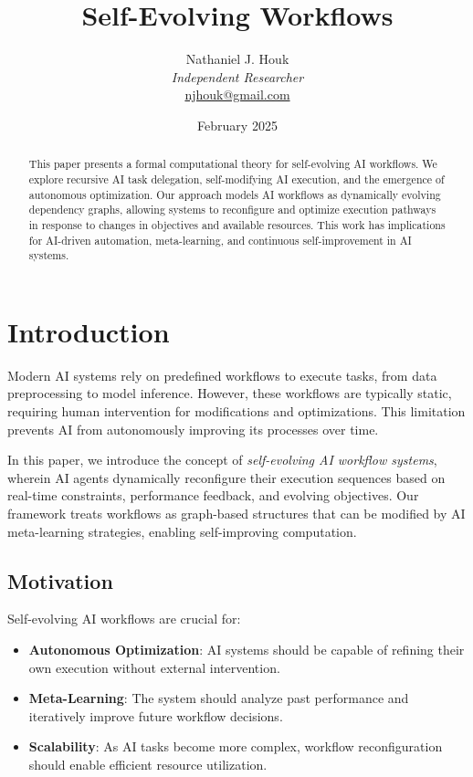 \documentclass{article}
\title{Self-Evolving Workflows}
\author{Nathaniel J. Houk\\
\textit{Independent Researcher}\\
\href{mailto:njhouk@gmail.com}{njhouk@gmail.com}}
\date{February 2025}
\begin{document}
\maketitle
\tableofcontents

\begin{abstract}
This paper presents a formal computational theory for self-evolving AI workflows. We explore recursive AI task delegation, self-modifying AI execution, and the emergence of autonomous optimization. Our approach models AI workflows as dynamically evolving dependency graphs, allowing systems to reconfigure and optimize execution pathways in response to changes in objectives and available resources. This work has implications for AI-driven automation, meta-learning, and continuous self-improvement in AI systems.
\end{abstract}

\section{Introduction}

Modern AI systems rely on predefined workflows to execute tasks, from data preprocessing to model inference. However, these workflows are typically static, requiring human intervention for modifications and optimizations. This limitation prevents AI from autonomously improving its processes over time.

In this paper, we introduce the concept of \emph{self-evolving AI workflow systems}, wherein AI agents dynamically reconfigure their execution sequences based on real-time constraints, performance feedback, and evolving objectives. Our framework treats workflows as graph-based structures that can be modified by AI meta-learning strategies, enabling self-improving computation.

\subsection{Motivation}

Self-evolving AI workflows are crucial for:
\begin{itemize}
    \item \textbf{Autonomous Optimization}: AI systems should be capable of refining their own execution without external intervention.
    \item \textbf{Meta-Learning}: The system should analyze past performance and iteratively improve future workflow decisions.
    \item \textbf{Scalability}: As AI tasks become more complex, workflow reconfiguration should enable efficient resource utilization.
\end{itemize}
\end{document}
